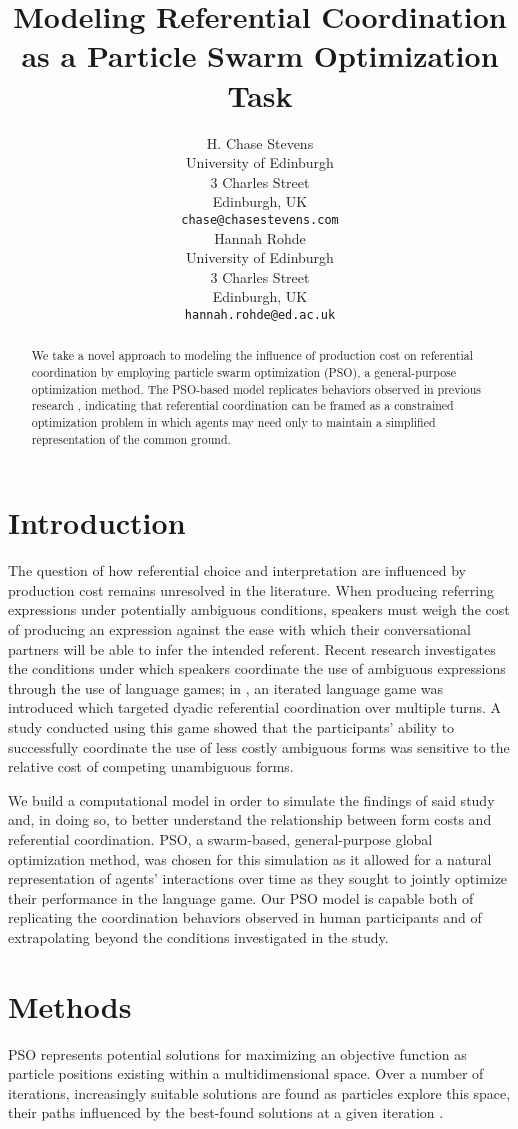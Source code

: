 \documentclass[a4paper,11pt]{article}
\title{Modeling Referential Coordination as a Particle Swarm Optimization Task}
\author{H. Chase Stevens \\
  University of Edinburgh \\
  3 Charles Street \\
  Edinburgh, UK \\
  {\tt chase@chasestevens.com} \\\And
  Hannah Rohde \\
  University of Edinburgh \\
  3 Charles Street \\
  Edinburgh, UK \\
  {\tt hannah.rohde@ed.ac.uk} \\}
\date{}
\begin{document}
\maketitle
\begin{abstract}
We take a novel approach to modeling the influence of production cost on referential coordination by employing particle swarm optimization (PSO), a general-purpose optimization method. The PSO-based model replicates behaviors observed in previous research \cite{rohde2012,brennan1996}, indicating that referential coordination can be framed as a constrained optimization problem in which agents may need only to maintain a simplified representation of the common ground.
\end{abstract}

\section{Introduction}
The question of how referential choice and interpretation are influenced by production cost remains unresolved in the literature. When producing referring expressions under potentially ambiguous conditions, speakers must weigh the cost of producing an expression against the ease with which their conversational partners will be able to infer the intended referent. Recent research \cite{rohde2012,degen2012,frank2012} investigates the conditions under which speakers coordinate the use of ambiguous expressions through the use of language games; in \citeauthor{rohde2012}, an iterated language game was introduced which targeted dyadic referential coordination over multiple turns. A study conducted using this game showed that the participants' ability to successfully coordinate the use of less costly ambiguous forms was sensitive to the relative cost of competing unambiguous forms.

We build a computational model in order to simulate the findings of said study and, in doing so, to better understand the relationship between form costs and referential coordination. PSO, a swarm-based, general-purpose global optimization method, was chosen for this simulation as it allowed for a natural representation of agents' interactions over time as they sought to jointly optimize their performance in the language game. Our PSO model is capable both of replicating the coordination behaviors observed in human participants and of extrapolating beyond the conditions investigated in the \citeauthor{rohde2012} study.

\section{Methods}
PSO represents potential solutions for maximizing an objective function as particle positions existing within a multidimensional space. Over a number of iterations, increasingly suitable solutions are found as particles explore this space, their paths influenced by the best-found solutions at a given iteration \cite{kennedy1995}.
\end{document}

